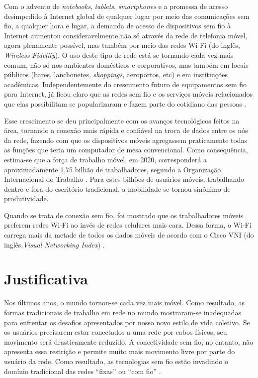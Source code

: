 Com o advento de \textit{notebooks}, \textit{tablets}, \textit{smartphones} e a promessa de acesso desimpedido à Internet global de qualquer lugar por meio das comunicações sem fio, a qualquer hora e lugar, a demanda de acesso de dispositivos sem fio à Internet aumentou consideravelmente não só através da rede de telefonia móvel, agora plenamente possível, mas também por meio das redes Wi-Fi (do inglês, \textit{Wireless Fidelity}). O uso deste tipo de rede está se tornando cada vez mais comum, não só nos ambientes domésticos e corporativos, mas também em locais públicos (bares, lanchonetes, \textit{shoppings}, aeroportos, etc) e em instituições acadêmicas. Independentemente do crescimento futuro de equipamentos sem fio para Internet, já ficou claro que as redes sem fio e os serviços móveis relacionados que elas possibilitam se popularizaram e fazem parte do cotidiano das pessoas \cite{gast2002,kurose2013}.

Esse crescimento se deu principalmente com os avanços tecnológicos feitos na área, tornando a conexão mais rápida e confiável na troca de dados entre os nós da rede, fazendo com que os dispositivos móveis agregassem praticamente todas as funções que teria um computador de mesa convencional.
Como consequência, estima-se que a força de trabalho móvel, em 2020, corresponderá a aproximadamente 1,75 bilhão de trabalhadores, segundo a Organização Internacional do Trabalho \cite{wba2017}. Para estes bilhões de usuários móveis, trabalhando dentro e fora do escritório tradicional, a mobilidade se tornou sinônimo de produtividade.

Quando se trata de conexão sem fio, foi mostrado que os trabalhadores móveis preferem redes Wi-Fi ao invés de redes celulares mais cara. Dessa forma, o Wi-Fi carrega mais da metade de todos os dados móveis de acordo com o Cisco VNI (do inglês,\textit{Visual Networking Index}) \cite{wba2017}.

\section{Justificativa}
\label{sec:justificativa}

Nos últimos anos, o mundo tornou-se cada vez mais móvel. Como resultado, as formas tradicionais de trabalho em rede no mundo mostraram-se inadequadas para enfrentar os desafios apresentados por nosso novo estilo de vida coletivo. Se os usuários precisarem estar conectados a uma rede por cabos físicos, seu movimento será drasticamente reduzido. A conectividade sem fio, no entanto, não apresenta essa restrição e permite muito mais movimento livre por parte do usuário da rede. Como resultado, as tecnologias sem fio estão invadindo o domínio tradicional das redes ``fixas'' ou ``com fio'' \cite{gast2002}.

